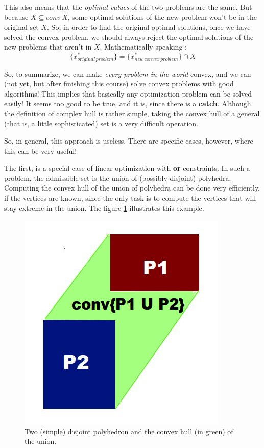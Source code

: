 This also means that the \textit{optimal values} of the two problems are the same. But because $X \subseteq conv \: X$, some optimal solutions of the new problem won't be in the original set $X$. So, in order to find the original optimal solutions, once we have solved the convex problem, we should always reject the optimal solutions of the new problems that aren't in $X$. Mathematically speaking : 
$$\{x^*_{original\,problem}\} = \{x^*_{new\,convex\,problem}\} \cap X $$

So, to summarize, we can make \textit{every problem in the world} convex, and we can (not yet, but after finishing this course) solve convex problems with good algorithms! This implies that basically any optimization problem can be solved easily! It seems too good to be true, and it is, since there is a \textbf{catch}\label{catch}. Although the definition of complex hull is rather simple, taking the convex hull of a general (that is, a little sophisticated) set is a very difficult operation.

So, in general, this approach is useless. There are specific cases, however, where this can be very useful!

The first, is a special case of linear optimization with \textbf{or} constraints. In such a problem, the admissible set is the union of (possibly disjoint) polyhedra. Computing the convex hull of the union of polyhedra can be done very efficiently, if the vertices are known, since the only task is to compute the vertices that will stay extreme in the union. The figure \ref{fig:my_label} illustrates this example.

\begin{figure}[H]
\centering
\includegraphics[scale=.4]{./images/Course2_polynoms}
\caption{Two (simple) disjoint polyhedron and the convex hull (in green) of the union.}
\label{fig:my_label}
\end{figure}

